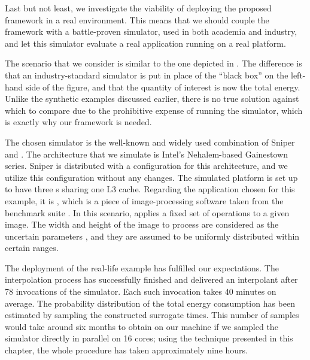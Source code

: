 Last but not least, we investigate the viability of deploying the proposed
framework in a real environment. This means that we should couple the framework
with a battle-proven simulator, used in both academia and industry, and let this
simulator evaluate a real application running on a real platform.

The scenario that we consider is similar to the one depicted in
. The difference is that an industry-standard simulator
is put in place of the ``black box'' on the left-hand side of the figure, and
that the quantity of interest \g is now the total energy. Unlike the synthetic
examples discussed earlier, there is no true solution against which to compare
due to the prohibitive expense of running the simulator, which is exactly why
our framework is needed.

The chosen simulator is the well-known and widely used combination of Sniper
\cite{carlson2011} and  \cite{li2009}. The architecture that we
simulate is Intel's Nehalem-based Gainestown series. Sniper is distributed with
a configuration for this architecture, and we utilize this configuration without
any changes. The simulated platform is set up to have three s sharing
one L3 cache. Regarding the application chosen for this example, it is
, which is a piece of image-processing software taken from the
 benchmark suite \cite{bienia2011}. In this scenario, 
applies a fixed set of operations to a given image. The width and height of the
image to process are considered as the uncertain parameters \vu, and they are
assumed to be uniformly distributed within certain ranges.

The deployment of the real-life example has fulfilled our expectations. The
interpolation process has successfully finished and delivered an interpolant
after 78 invocations of the simulator. Each such invocation takes 40 minutes on
average. The probability distribution of the total energy consumption has been
estimated by sampling the constructed surrogate  times. This number
of samples would take around six months to obtain on our machine if we sampled
the simulator directly in parallel on 16 cores; using the technique presented in
this chapter, the whole procedure has taken approximately nine hours.
